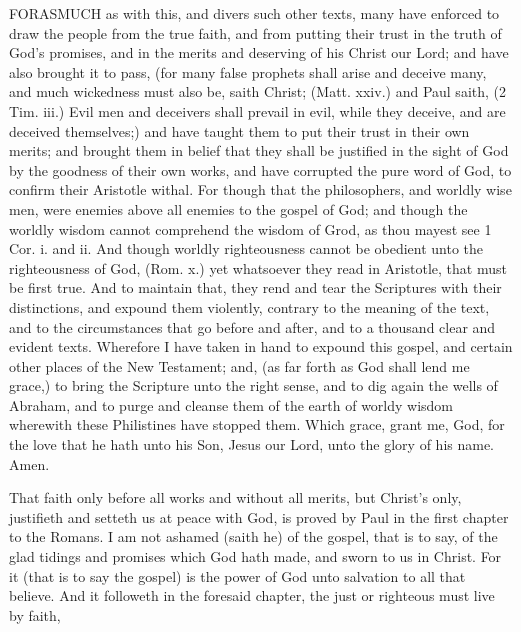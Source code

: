 \documentclass{article}
\begin{document}
FORASMUCH as with this, and divers such other 
texts, many have enforced to draw the people from the 
true faith, and from putting their trust in the truth of 
God's promises, and in the merits and deserving of his 
Christ our Lord; and have also brought it to pass, (for 
many false prophets shall arise and deceive many, and 
much wickedness must also be, saith Christ; (Matt. xxiv.) 
and Paul saith, (2 Tim. iii.) Evil men and deceivers 
shall prevail in evil, while they deceive, and are deceived 
themselves;) and have taught them to put their trust in 
their own merits; and brought them in belief that they 
shall be justified in the sight of God by the goodness of 
their own works, and have corrupted the pure word of 
God, to confirm their Aristotle withal. For though that 
the philosophers, and worldly wise men, were enemies 
above all enemies to the gospel of God; and though the 
worldly wisdom cannot comprehend the wisdom of Grod, 
as thou mayest see 1 Cor. i. and ii. And though worldly 
righteousness cannot be obedient unto the righteousness of 
God, (Rom. x.) yet whatsoever they read in Aristotle, 
that must be first true. And to maintain that, they rend 
and tear the Scriptures with their distinctions, and
expound them violently, contrary to the meaning of the text, 
and to the circumstances that go before and after, and to 
a thousand clear and evident texts. Wherefore I have 
taken in hand to expound this gospel, and certain other 
places of the New Testament; and, (as far forth as God 
shall lend me grace,) to bring the Scripture unto the 
right sense, and to dig again the wells of Abraham, and 
to purge and cleanse them of the earth of worldy wisdom 
wherewith these Philistines have stopped them. Which 
grace, grant me, God, for the love that he hath unto 
his Son, Jesus our Lord, unto the glory of his name. 
Amen. 


That faith only before all works and without all merits, 
but Christ's only, justifieth and setteth us at peace with 
God, is proved by Paul in the first chapter to the Romans. 
I am not ashamed (saith he) of the gospel, that is to say, 
of the glad tidings and promises which God hath made, 
and sworn to us in Christ. For it (that is to say the gospel) 
is the power of God unto salvation to all that believe. 
And it followeth in the foresaid chapter, the just or
righteous must live by faith, 
\end{document}
